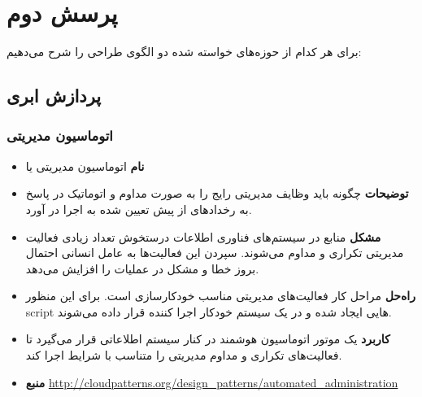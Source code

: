 
\section{پرسش دوم}

برای هر کدام از حوزه‌های خواسته شده دو الگوی طراحی را شرح می‌دهیم:

\subsection{پردازش ابری}

\subsubsection{اتوماسیون مدیریتی}
\begin{itemize}
\item \textbf{نام} \newline
اتوماسیون مدیریتی یا 
\item \textbf{توضیحات} \newline
چگونه باید وظایف مدیریتی رایج را به صورت مداوم و اتوماتیک در پاسخ به رخداد‌های از پیش تعیین شده به اجرا در آورد.
\item \textbf{مشکل} \newline
منابع در سیستم‌های فناوری اطلاعات درستخوش تعداد زیادی فعالیت مدیریتی تکراری و مداوم می‌شوند. سپردن این فعالیت‌ها به عامل انسانی احتمال بروز خطا و مشکل در عملیات را افزایش می‌دهد.
\item \textbf{راه‌حل} \newline
مراحل کار فعالیت‌های مدیریتی مناسب خودکار‌سازی است. برای این منظور script هایی ایجاد شده و در یک سیستم خودکار اجرا کننده قرار داده می‌شوند.
\item \textbf{کاربرد} \newline
یک موتور اتوماسیون هوشمند در کنار سیستم اطلاعاتی قرار می‌گیرد تا فعالیت‌های تکراری و مداوم مدیریتی را متناسب با شرایط اجرا کند.
\item \textbf{منبع} \newline
\url{http://cloudpatterns.org/design_patterns/automated_administration}
\end{itemize}


